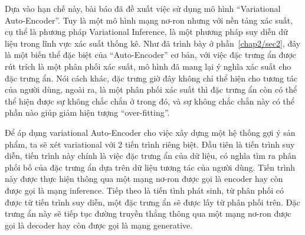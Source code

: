     Dựa vào hạn chế này, bài báo đã đề xuất việc sử dụng mô hình ``Variational Auto-Encoder''. 
    Tuy là một mô hình mạng nơ-ron nhưng với nền tảng xác suất, cụ thể là phương pháp Variational Inference, là một phương pháp suy diễn dữ liệu trong lĩnh vực xác suất thống kê.
    Như đã trình bày ở phần~\ref{chap2/sec2}, đây là một biến thể đặc biệt của ``Auto-Encoder'' cơ bản, với việc đặc trưng ẩn được rút trích là một phân phối xác suất, mô hình đã mang lại ý nghĩa xác suất cho đặc trưng ẩn.
    Nói cách khác, đặc trưng giờ đây không chỉ thể hiện cho tương tác của người dùng, ngoài ra, là một phân phối xác suất thì đặc trưng ẩn còn có thể thể hiện được sự không chắc chắn ở trong đó, và sự không chắc chắn này có thể phần nào giúp giảm hiện tượng ``over-fitting''.



    
    Để áp dụng variational Auto-Encoder cho việc xây dựng một hệ thống gợi ý sản phẩm, ta sẽ xét variational với 2 tiến trình riêng biệt. 
    Đầu tiên là tiến trình suy diễn, tiến trình này chính là việc đặc trưng ẩn của dữ liệu, có nghĩa tìm ra phân phối bố của đặc trưng ẩn dựa trên dữ liệu tương tác của người dùng. 
    Tiến trình này được thực hiện thông qua một mạng nơ-ron được gọi là encoder hay còn được gọi là mạng inference.
    Tiếp theo là tiến tình phát sinh, từ phân phối có được từ tiến trình suy diễn, một đặc trưng ẩn sẽ được lấy từ phân phối trên. 
    Đặc trưng ẩn này sẽ tiếp tục đường truyền thẳng thông qua một mạng nơ-ron được gọi là decoder hay còn được gọi là mạng generative.



